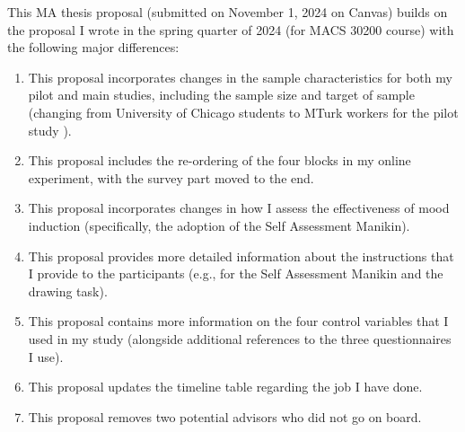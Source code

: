 \documentclass[../Proposal_Writing_Sample.tex]{subfiles}
\begin{document}
This MA thesis proposal (submitted on November 1, 2024 on Canvas) builds on the proposal I wrote in the spring quarter of 2024 (for MACS 30200 course) with the following major differences:
\begin{enumerate}
    \item This proposal incorporates changes in the sample characteristics for both my pilot and main studies, including the sample size and target of sample (changing from University of Chicago students to MTurk workers for the pilot study ).
    \item This proposal includes the re-ordering of the four blocks in my online experiment, with the survey part moved to the end. 
    \item This proposal incorporates changes in how I assess the effectiveness of mood induction (specifically, the adoption of the Self Assessment Manikin).
    \item This proposal provides more detailed information about the instructions that I provide to the participants (e.g., for the Self Assessment Manikin and the drawing task). 
    \item This proposal contains more information on the four control variables that I used in my study (alongside additional references to the three questionnaires I use). 
    \item This proposal updates the timeline table regarding the job I have done. 
    \item This proposal removes two potential advisors who did not go on board. 
\end{enumerate}
\end{document}
